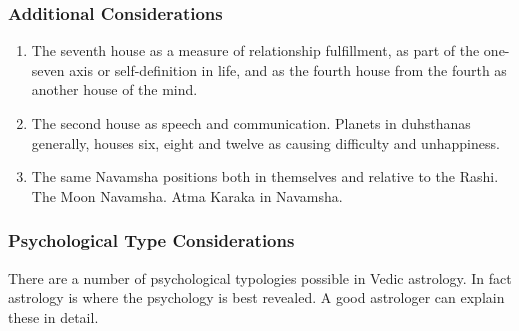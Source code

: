 \subsubsection{Additional Considerations}

\begin{enumerate}
\item The seventh house as a measure of relationship fulfillment, as part of the one-seven axis or self-definition in life, and as the fourth house from the fourth as another house of the mind.
\item The second house as speech and communication.
Planets in duhsthanas generally, houses six, eight and twelve as causing difficulty and unhappiness.
\item The same Navamsha positions both in themselves and relative to the Rashi. The Moon Navamsha. Atma Karaka in Navamsha.
\end{enumerate} 
 
\subsubsection{Psychological Type Considerations}
 

There are a number of psychological typologies possible in Vedic astrology. In fact astrology is where the psychology is best revealed. A good astrologer can explain these in detail.

